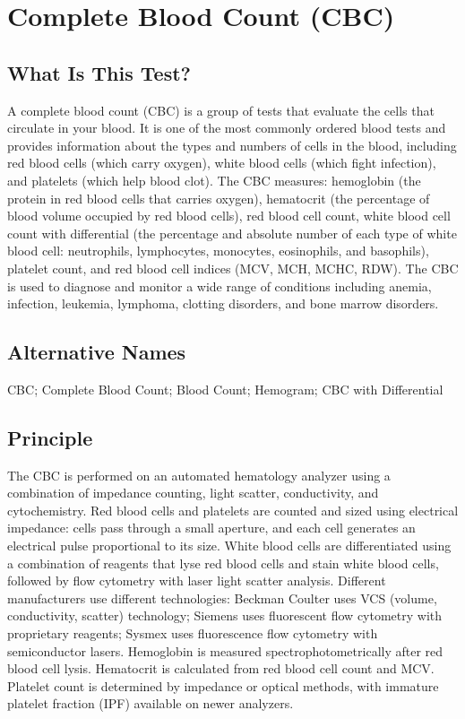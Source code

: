 \chapter{Complete Blood Count (CBC)}

\section*{What Is This Test?}
A complete blood count (CBC) is a group of tests that evaluate the cells that circulate in your blood. It is one of the most commonly ordered blood tests and provides information about the types and numbers of cells in the blood, including red blood cells (which carry oxygen), white blood cells (which fight infection), and platelets (which help blood clot). The CBC measures: hemoglobin (the protein in red blood cells that carries oxygen), hematocrit (the percentage of blood volume occupied by red blood cells), red blood cell count, white blood cell count with differential (the percentage and absolute number of each type of white blood cell: neutrophils, lymphocytes, monocytes, eosinophils, and basophils), platelet count, and red blood cell indices (MCV, MCH, MCHC, RDW). The CBC is used to diagnose and monitor a wide range of conditions including anemia, infection, leukemia, lymphoma, clotting disorders, and bone marrow disorders.

\section*{Alternative Names}
CBC; Complete Blood Count; Blood Count; Hemogram; CBC with Differential

\section*{Principle}
The CBC is performed on an automated hematology analyzer using a combination of impedance counting, light scatter, conductivity, and cytochemistry. Red blood cells and platelets are counted and sized using electrical impedance: cells pass through a small aperture, and each cell generates an electrical pulse proportional to its size. White blood cells are differentiated using a combination of reagents that lyse red blood cells and stain white blood cells, followed by flow cytometry with laser light scatter analysis. Different manufacturers use different technologies: Beckman Coulter uses VCS (volume, conductivity, scatter) technology; Siemens uses fluorescent flow cytometry with proprietary reagents; Sysmex uses fluorescence flow cytometry with semiconductor lasers. Hemoglobin is measured spectrophotometrically after red blood cell lysis. Hematocrit is calculated from red blood cell count and MCV. Platelet count is determined by impedance or optical methods, with immature platelet fraction (IPF) available on newer analyzers.

